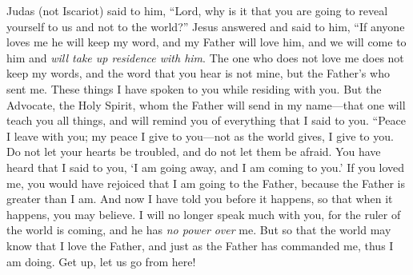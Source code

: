 \begin{biblechapter}
\verse Judas (not Iscariot) said to him, “Lord, why is it that you are going to reveal yourself to us and not to the world?”
\verse Jesus answered and said to him, “If anyone loves me he will keep my word, and my Father will love him, and we will come to him and \textit{will take up residence with him}.
\verse The one who does not love me does not keep my words, and the word that you hear is not mine, but the Father’s who sent me.
\verse These things I have spoken to you while residing with you.
\verse But the Advocate, the Holy Spirit, whom the Father will send in my name—that one will teach you all things, and will remind you of everything that I said to you.
\verse “Peace I leave with you; my peace I give to you—not as the world gives, I give to you. Do not let your hearts be troubled, and do not let them be afraid.
\verse You have heard that I said to you, ‘I am going away, and I am coming to you.’ If you loved me, you would have rejoiced that I am going to the Father, because the Father is greater than I am.
\verse And now I have told you before it happens, so that when it happens, you may believe.
\verse I will no longer speak much with you, for the ruler of the world is coming, and he has \textit{no power} \textit{over} me.
\verse But so that the world may know that I love the Father, and just as the Father has commanded me, thus I am doing. Get up, let us go from here!
\end{biblechapter}

